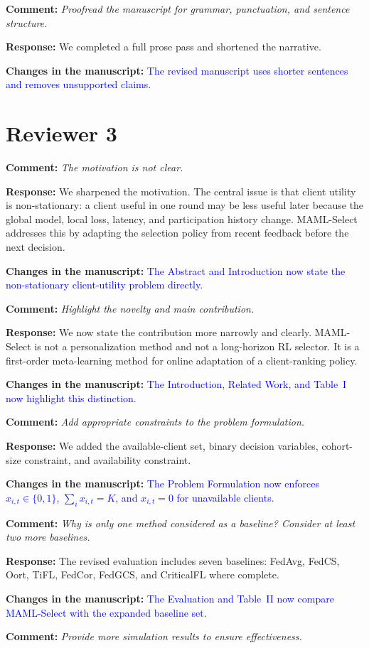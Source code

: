\documentclass[11pt]{article}
\newcommand{\comment}[1]{\textbf{Comment:} \textit{#1}}
\newcommand{\response}[1]{\textbf{Response:} #1}
\newcommand{\change}[1]{\textbf{Changes in the manuscript:} \textcolor{blue}{#1}}
\begin{document}
\comment{Proofread the manuscript for grammar, punctuation, and sentence structure.}

\response{We completed a full prose pass and shortened the narrative.}

\change{The revised manuscript uses shorter sentences and removes unsupported claims.}

\section*{Reviewer 3}

\comment{The motivation is not clear.}

\response{We sharpened the motivation. The central issue is that client utility is non-stationary: a client useful in one round may be less useful later because the global model, local loss, latency, and participation history change. MAML-Select addresses this by adapting the selection policy from recent feedback before the next decision.}

\change{The Abstract and Introduction now state the non-stationary client-utility problem directly.}

\comment{Highlight the novelty and main contribution.}

\response{We now state the contribution more narrowly and clearly. MAML-Select is not a personalization method and not a long-horizon RL selector. It is a first-order meta-learning method for online adaptation of a client-ranking policy.}

\change{The Introduction, Related Work, and Table~I now highlight this distinction.}

\comment{Add appropriate constraints to the problem formulation.}

\response{We added the available-client set, binary decision variables, cohort-size constraint, and availability constraint.}

\change{The Problem Formulation now enforces $x_{i,t}\in\{0,1\}$, $\sum_i x_{i,t}=K$, and $x_{i,t}=0$ for unavailable clients.}

\comment{Why is only one method considered as a baseline? Consider at least two more baselines.}

\response{The revised evaluation includes seven baselines: FedAvg, FedCS, Oort, TiFL, FedCor, FedGCS, and CriticalFL where complete.}

\change{The Evaluation and Table~II now compare MAML-Select with the expanded baseline set.}

\comment{Provide more simulation results to ensure effectiveness.}
\end{document}

